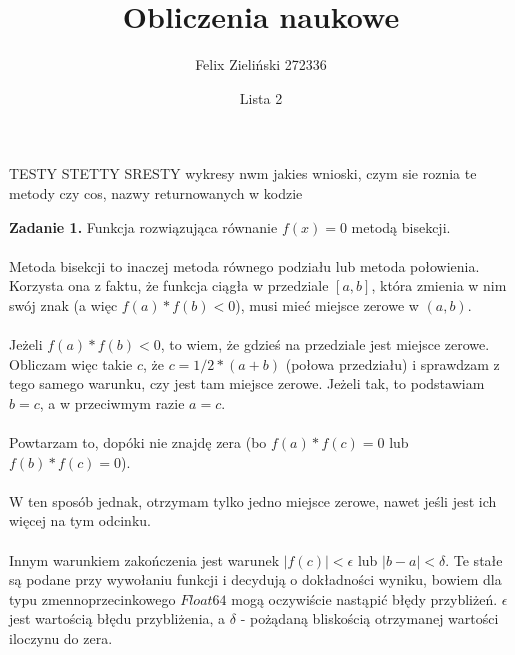 \documentclass[15pt, a4paper]{article}
\title{Obliczenia naukowe}
\author{Felix Zieliński 272336}
\date{Lista 2}
\begin{document}
\maketitle

\noindent TESTY STETTY SRESTY
wykresy 
nwm jakies wnioski, czym sie roznia te metody czy cos, nazwy returnowanych w kodzie

\vspace{0.5cm}

\noindent\hrulefill

\vspace{0.5cm}


\noindent\textbf{Zadanie 1.} Funkcja rozwiązująca równanie \( f(x) = 0 \) metodą bisekcji.\\\\
\noindent Metoda bisekcji to inaczej metoda równego podziału lub metoda połowienia. 
Korzysta ona z faktu, że funkcja ciągła w przedziale \( [a, b] \), która zmienia w nim swój znak (a więc \( f(a) * f(b) < 0 \)), musi mieć miejsce zerowe w \( (a, b) \).\\\\
\noindent Jeżeli \( f(a) * f(b) < 0 \), to wiem, że gdzieś na przedziale jest miejsce zerowe. Obliczam więc takie \(c\), że \( c = 1/2 * (a + b) \) (połowa przedziału) i sprawdzam z tego samego warunku, czy jest tam miejsce zerowe. Jeżeli tak, to podstawiam \( b = c \), a w przeciwmym razie \( a = c \).\\\\
\noindent Powtarzam to, dopóki nie znajdę zera (bo \( f(a) * f(c) = 0 \) lub \(f(b) * f(c) = 0 \)). \\\\
\noindent W ten sposób jednak, otrzymam tylko jedno miejsce zerowe, nawet jeśli jest ich więcej na tym odcinku.\\\\ 
\noindent Innym warunkiem zakończenia jest warunek \(|f(c)| < \epsilon \) lub \(|b - a| < \delta \). Te stałe są podane przy wywołaniu funkcji i decydują o dokładności wyniku, bowiem dla typu zmennoprzecinkowego \(Float64\) mogą oczywiście nastąpić błędy przybliżeń. \( \epsilon \) jest wartością błędu przybliżenia, a \(\delta\) - pożądaną bliskością otrzymanej wartości iloczynu do zera. 

\vspace{0.5cm}

\noindent\hrulefill

\vspace{0.5cm}
\end{document}

